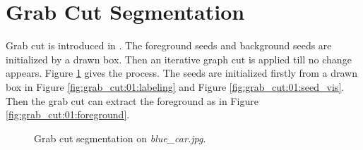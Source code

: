 \documentclass[paper=a4, fontsize=11pt]{scrartcl}
\begin{document}
\section{Grab Cut Segmentation}

Grab cut is introduced in \cite{rother2004grabcut}.
The foreground seeds and background seeds are initialized by a drawn box.
Then an iterative graph cut is applied till no change appears.
Figure \ref{fig:grab_cut:01} gives the process.
The seeds are initialized firstly from a drawn box in Figure \ref{fig:grab_cut:01:labeling} and Figure \ref{fig:grab_cut:01:seed_vis}.
Then the grab cut can extract the foreground as in Figure \ref{fig:grab_cut:01:foreground}.

 
\begin{figure}[h]
\centering
{}
\caption{Grab cut segmentation on \emph{blue\_car.jpg}. }
\label{fig:grab_cut:01}
\end{figure}
\end{document}
